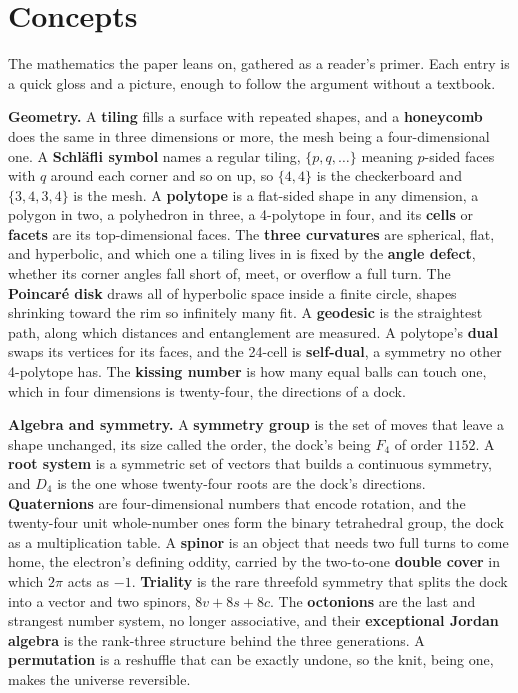 \section{Concepts}

The mathematics the paper leans on, gathered as a reader's primer. Each entry is a quick gloss and a picture, enough to follow the argument without a textbook.

\textbf{Geometry.} A \textbf{tiling} fills a surface with repeated shapes, and a \textbf{honeycomb} does the same in three dimensions or more, the mesh being a four-dimensional one. A \textbf{Schl\"afli symbol} names a regular tiling, $\{p,q,\dots\}$ meaning $p$-sided faces with $q$ around each corner and so on up, so $\{4,4\}$ is the checkerboard and $\{3,4,3,4\}$ is the mesh. A \textbf{polytope} is a flat-sided shape in any dimension, a polygon in two, a polyhedron in three, a 4-polytope in four, and its \textbf{cells} or \textbf{facets} are its top-dimensional faces. The \textbf{three curvatures} are spherical, flat, and hyperbolic, and which one a tiling lives in is fixed by the \textbf{angle defect}, whether its corner angles fall short of, meet, or overflow a full turn. The \textbf{Poincar\'e disk} draws all of hyperbolic space inside a finite circle, shapes shrinking toward the rim so infinitely many fit. A \textbf{geodesic} is the straightest path, along which distances and entanglement are measured. A polytope's \textbf{dual} swaps its vertices for its faces, and the 24-cell is \textbf{self-dual}, a symmetry no other 4-polytope has. The \textbf{kissing number} is how many equal balls can touch one, which in four dimensions is twenty-four, the directions of a dock.

\textbf{Algebra and symmetry.} A \textbf{symmetry group} is the set of moves that leave a shape unchanged, its size called the order, the dock's being $F_4$ of order $1152$. A \textbf{root system} is a symmetric set of vectors that builds a continuous symmetry, and $D_4$ is the one whose twenty-four roots are the dock's directions. \textbf{Quaternions} are four-dimensional numbers that encode rotation, and the twenty-four unit whole-number ones form the binary tetrahedral group, the dock as a multiplication table. A \textbf{spinor} is an object that needs two full turns to come home, the electron's defining oddity, carried by the two-to-one \textbf{double cover} in which $2\pi$ acts as $-1$. \textbf{Triality} is the rare threefold symmetry that splits the dock into a vector and two spinors, $8v + 8s + 8c$. The \textbf{octonions} are the last and strangest number system, no longer associative, and their \textbf{exceptional Jordan algebra} is the rank-three structure behind the three generations. A \textbf{permutation} is a reshuffle that can be exactly undone, so the knit, being one, makes the universe reversible.


